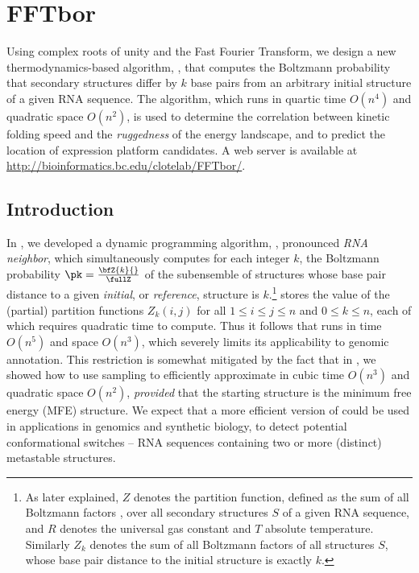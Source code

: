 
\chapter{FFTbor}

\label{FFTbor}


Using complex roots of unity and the Fast Fourier Transform, we
design a new thermodynamics-based algorithm, \fftbor, that
computes the Boltzmann probability that secondary structures differ
by $k$ base pairs from an arbitrary initial structure of a given RNA
sequence. The algorithm, which runs in quartic time $O(n^4)$ and quadratic space
$O(n^2)$, is used to determine the
correlation between kinetic folding speed and the {\em ruggedness}
of the energy landscape, and to predict the location of \rb
expression platform candidates. A web server is available at
\url{http://bioinformatics.bc.edu/clotelab/FFTbor/}.

\section*{Introduction}

In \citep{freyhult.b07}, we developed a dynamic programming algorithm,
\rnabor, pronounced {\em RNA neighbor}, which simultaneously computes for
each integer $k$, the Boltzmann probability $\pk = \frac{\bfZ{k}{}}{\fullZ}$
of the subensemble of structures
whose base pair distance to a given {\em initial}, or
{\em reference}, structure \strSt is $k$.\footnote{As later
explained, $Z$ denotes the partition function, defined as the sum of
all Boltzmann factors \boltzf{\str}, over all secondary structures $S$
of a given RNA sequence, and $R$ denotes the  universal
gas constant and $T$ absolute temperature. Similarly $Z_k$ denotes the
sum of all Boltzmann factors of all structures $S$, whose base pair distance
to the initial structure \strSt is exactly $k$.}
\rnabor stores the value of the (partial)
partition functions $Z_k(i,j)$ for all $1 \leq i \leq j \leq n$ and
$0 \leq k \leq n$, each of which requires quadratic time to compute.
Thus it follows that \rnabor runs in time $O(n^5)$ and space
$O(n^3)$, which severely limits its applicability to genomic annotation.
This restriction is somewhat mitigated by the fact that
in \citep{CloteLouLorenz}, we showed how to use sampling
\citep{Ding.nar03} to efficiently approximate
\rnabor in cubic time $O(n^3)$ and quadratic space $O(n^2)$,
{\em provided} that the starting structure \strSt is the minimum free
energy (MFE) structure. We expect that a more efficient version of
\rnabor could be used in applications in genomics and synthetic
biology, to detect potential conformational switches --
RNA sequences containing two or more (distinct) metastable structures.

